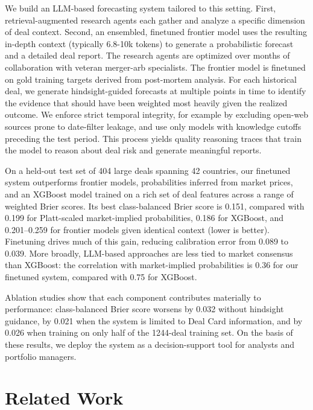 \documentclass{article}
\theoremstyle{plain}
\theoremstyle{definition}
\theoremstyle{remark}
\begin{document}
We build an LLM-based forecasting system tailored to this setting. First, retrieval-augmented research agents each gather and analyze a specific dimension of deal context. Second, an ensembled, finetuned frontier model uses the resulting in-depth context (typically 6.8-10k tokens) to generate a probabilistic forecast and a detailed deal report. The research agents are optimized over months of collaboration with veteran merger-arb specialists.
The frontier model is finetuned on gold training targets derived from post-mortem analysis. For each historical deal, we generate hindsight-guided forecasts at multiple points in time to identify the evidence that should have been weighted most heavily given the realized outcome.
We enforce strict temporal integrity, for example by excluding open-web sources prone to date-filter leakage, and use only models with knowledge cutoffs preceding the test period. This process yields quality reasoning traces that train the model to reason about deal risk and generate meaningful reports. 

On a held-out test set of 404 large deals spanning 42 countries, our finetuned system outperforms frontier models, probabilities inferred from market prices, and an XGBoost model trained on a rich set of deal features across a range of weighted Brier scores. Its best class-balanced Brier score is 0.151, compared with 0.199 for Platt-scaled market-implied probabilities, 0.186 for XGBoost, and 0.201--0.259 for frontier models given identical context (lower is better). Finetuning drives much of this gain, reducing calibration error from 0.089 to 0.039. More broadly, LLM-based approaches are less tied to market consensus than XGBoost: the correlation with market-implied probabilities is 0.36 for our finetuned system, compared with 0.75 for XGBoost.

Ablation studies show that each component contributes materially to performance: class-balanced Brier score worsens by 0.032 without hindsight guidance, by 0.021 when the system is limited to Deal Card information, and by 0.026 when training on only half of the 1244-deal training set. On the basis of these results, we deploy the system as a decision-support tool for analysts and portfolio managers.




\section{Related Work}
\end{document}
